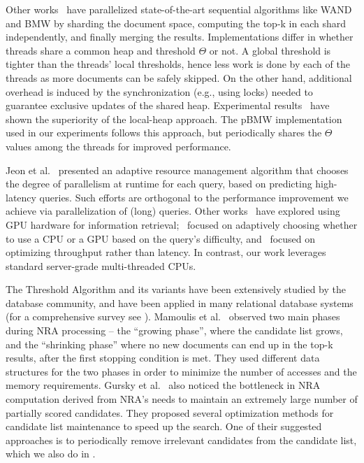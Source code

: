 Other works~\cite{Bonacic:2010,rojas2013efficient} have parallelized state-of-the-art sequential algorithms like WAND and BMW  by sharding the document space, computing the top-k in each shard independently, and finally merging the results.  Implementations differ in whether threads share a common  
heap and  threshold $\Theta$ or not. A global threshold is  tighter than the threads' local thresholds, hence  less work is done by each of the threads as  more documents can be safely skipped. 
On the other hand, additional overhead is induced by the synchronization (e.g., using locks) needed to guarantee exclusive updates of the shared heap. 
Experimental results~\cite{rojas2013efficient} have shown the superiority of the local-heap approach. The pBMW implementation used in our experiments follows this approach,
but periodically shares the  $\Theta$ values among the threads for improved performance.

Jeon et al.~\cite{Jeon:2014} 
presented an adaptive resource management algorithm that chooses the degree of parallelism at runtime for each query, based on predicting high-latency queries.
Such efforts are orthogonal to the performance improvement we achieve via parallelization of (long) queries.
Other works~\cite{Ao:2011,Liu:2018:GUC:3178487.3178512} have explored using GPU hardware for information retrieval;~\cite{Liu:2018:GUC:3178487.3178512} 
focused on adaptively choosing whether to use a CPU or a GPU based on the query's difficulty, and~\cite{Ao:2011} focused on optimizing throughput rather than latency. 
In contrast, our work leverages standard server-grade multi-threaded CPUs. 

The Threshold Algorithm and its variants \cite{Fagin:2003,Akbarinia:2007} have been extensively studied by the database community, and have been applied in many relational database systems (for a comprehensive survey see \cite{ilyas2008survey}). 
Mamoulis et al.~\cite{Mamoulis:2007} observed two main phases during NRA processing -- the ``growing phase'', where the candidate list grows, and the ``shrinking phase'' where no new documents can end up in the top-k results, after the first stopping condition is met. They used different data structures for the two phases in order to minimize the number of accesses and the memory requirements. 
Gursky et al.~\cite{Gursky:2008} also noticed the bottleneck in NRA computation derived from NRA's needs to maintain an extremely large number of partially scored candidates. They proposed several optimization methods for candidate list maintenance to speed up the search. One of their suggested approaches is to periodically remove irrelevant candidates from the candidate list, which we also do in \alg.

